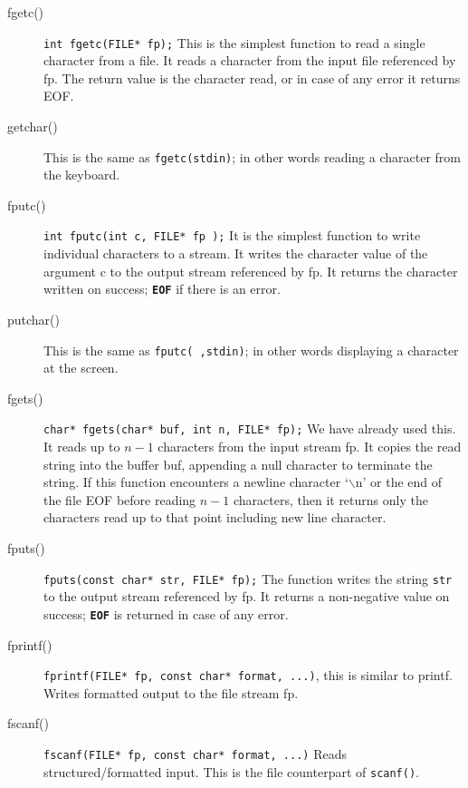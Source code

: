 \documentclass[11pt,a4paper]{article}
\begin{document}
\begin{description}
\item [fgetc()] \lstinline!int fgetc(FILE* fp);! This is the simplest function to read a single character from a file. It reads a character from the input file referenced by fp. The return value is the character read, or in case of any error it returns EOF. 

\item [getchar()] This is the same as \texttt{fgetc(stdin)}; in other words reading a character from the keyboard.

\item[fputc()] \lstinline!int fputc(int c, FILE* fp );! It is the simplest function to write individual characters to a stream. It writes the character value of the argument c to the output stream referenced by fp. It returns the character written on success; \textbf{\texttt{EOF}} if there is an error. 

\item [putchar()] This is the same as \texttt{fputc( ,stdin)}; in other words displaying a character at the screen.

\item[fgets()] \lstinline !char* fgets(char* buf, int n, FILE* fp);! We have already used this. It reads up to $n - 1$ characters from the input stream fp. It copies the read string into the buffer buf, appending a null character to terminate the string. If this function encounters a newline character `$\backslash$n' or the end of the file EOF before reading $n - 1$ characters, then it returns only the characters read up to that point including new line character. 

\item[fputs()] \lstinline!fputs(const char* str, FILE* fp);! The function writes the string \texttt{str} to the output stream referenced by fp. It returns a non-negative value on success; \textbf{\texttt{EOF}} is returned in case of any error. 

\item[fprintf()] \lstinline!fprintf(FILE* fp, const char* format, ...)!, this is similar to printf. Writes formatted output to the file stream fp.  

\item[fscanf()] \lstinline!fscanf(FILE* fp, const char* format, ...)! Reads structured/formatted input. This is the file counterpart of \texttt{scanf()}. 

\end{description}
\end{document}
